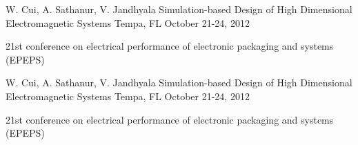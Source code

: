 

\begin{cventries}

  \cventry
    {W. Cui, A. Sathanur, V. Jandhyala} %
    {Simulation-based Design of High Dimensional Electromagnetic
Systems} %
    {Tempa, FL} %
    {October 21-24, 2012} %
    {
      \begin{cvitems} %
        \item {21st conference on electrical performance of electronic packaging and systems (EPEPS)}
      \end{cvitems}
    }

\cventry
    {W. Cui, A. Sathanur, V. Jandhyala} %
    {Simulation-based Design of High Dimensional Electromagnetic
Systems} %
    {Tempa, FL} %
    {October 21-24, 2012} %
    {
      \begin{cvitems} %
        \item {21st conference on electrical performance of electronic packaging and systems (EPEPS)}
      \end{cvitems}
    }
\end{cventries}
